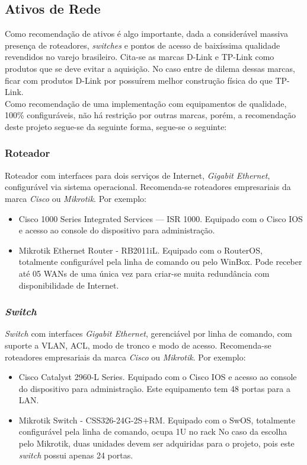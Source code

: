 \documentclass[	DIV=calc,%
							paper=a4,%
							fontsize=12pt,%
							onecolumn]{scrartcl}	 					%
\begin{document}
\subsection{Ativos de Rede}


Como recomendação de ativos é algo importante, dada a considerável massiva presença de roteadores, \textit{switches} e pontos de acesso de baixíssima qualidade revendidos no varejo brasileiro. Cita-se as marcas D-Link e TP-Link como produtos que se deve evitar a aquisição. No caso entre de dilema dessas marcas, ficar com produtos D-Link por possuírem melhor construção física do que TP-Link. 
\\

Como recomendação de uma implementação com equipamentos de qualidade, 100\% configuráveis, não há restrição por outras marcas, porém, a recomendação deste projeto segue-se da seguinte forma,  segue-se o seguinte:

\subsubsection{Roteador}

Roteador com interfaces para dois serviços de Internet, \textit{Gigabit Ethernet}, configurável via sistema operacional. Recomenda-se roteadores empresariais da marca \textit{Cisco} ou \textit{Mikrotik}. Por exemplo:

\begin{itemize}
\item{Cisco 1000 Series Integrated Services --- ISR 1000}. Equipado com o Cisco IOS e acesso ao console do dispositivo para administração.
\item{Mikrotik Ethernet Router - RB2011iL}. Equipado com o RouterOS, totalmente configurável pela linha de comando ou pelo WinBox. Pode receber até 05 WANs de uma única vez para criar-se muita redundância com disponibilidade de Internet. 
\end{itemize}

\subsubsection{\textit{Switch}}

\textit{Switch} com interfaces \textit{Gigabit Ethernet}, gerenciável por linha de comando, com suporte a VLAN, ACL, modo de tronco e modo de acesso. Recomenda-se roteadores empresariais da marca \textit{Cisco} ou \textit{Mikrotik}. Por exemplo:

\begin{itemize}
	\item{Cisco Catalyst 2960-L Series}. Equipado com o Cisco IOS e acesso ao console do dispositivo para administração. Este equipamento tem 48 portas para a LAN.
	\item{Mikrotik Switch - CSS326-24G-2S+RM}. Equipado com o SwOS, totalmente configurável pela linha de comando, ocupa 1U no rack No caso da escolha pelo Mikrotik, duas unidades devem ser adquiridas para o projeto, pois este \textit{switch} possui apenas 24 portas. 
\end{itemize}
\end{document}

